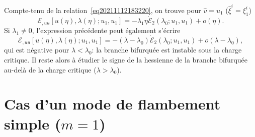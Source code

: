 \documentclass{article}
\begin{document}
Compte-tenu de la relation~\eqref{eq20211112183220}, on trouve pour $\hat{v} =
u_1$ ($\hat{\xi}^i = \xi_1^i$)
\begin{equation}
  \mathcal{E}_{, u  u} [u (\eta), \lambda (\eta) ; u_1, u_1] = -
  \lambda_1 \eta \dot{\mathcal{E}}_2 (\lambda_0 ; u_1, u_1) + o (\eta) .
\end{equation}
Si $\lambda_1 \neq 0$, l'expression pr{\'e}c{\'e}dente peut {\'e}galement
s'{\'e}crire
\begin{equation}
  \mathcal{E}_{, u  u} [u (\eta), \lambda (\eta) ; u_1, u_1] = -
  (\lambda - \lambda_0)  \dot{\mathcal{E}}_2 (\lambda_0 ; u_1, u_1) + o
  (\lambda - \lambda_0),
\end{equation}
qui est n{\'e}gative pour $\lambda < \lambda_0$: la branche bifurqu{\'e}e est
instable sous la charge critique. Il reste alors {\`a} {\'e}tudier le signe de
la hessienne de la branche bifurqu{\'e}e au-del{\`a} de la charge critique
($\lambda > \lambda_0$).

\section{Cas d'un mode de flambement simple ($m = 1$)}
\end{document}
